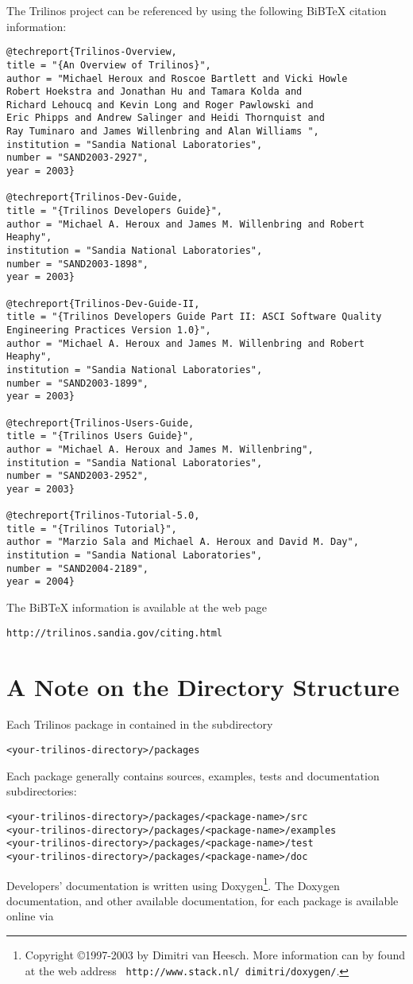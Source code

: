The Trilinos project can be referenced by using the following BiBTeX
citation information:
\begin{verbatim}
@techreport{Trilinos-Overview,
title = "{An Overview of Trilinos}",
author = "Michael Heroux and Roscoe Bartlett and Vicki Howle
Robert Hoekstra and Jonathan Hu and Tamara Kolda and
Richard Lehoucq and Kevin Long and Roger Pawlowski and
Eric Phipps and Andrew Salinger and Heidi Thornquist and
Ray Tuminaro and James Willenbring and Alan Williams ",
institution = "Sandia National Laboratories",
number = "SAND2003-2927",
year = 2003}

@techreport{Trilinos-Dev-Guide,
title = "{Trilinos Developers Guide}",
author = "Michael A. Heroux and James M. Willenbring and Robert Heaphy",
institution = "Sandia National Laboratories",
number = "SAND2003-1898",
year = 2003}

@techreport{Trilinos-Dev-Guide-II,
title = "{Trilinos Developers Guide Part II: ASCI Software Quality
Engineering Practices Version 1.0}",
author = "Michael A. Heroux and James M. Willenbring and Robert Heaphy",
institution = "Sandia National Laboratories",
number = "SAND2003-1899",
year = 2003}

@techreport{Trilinos-Users-Guide,
title = "{Trilinos Users Guide}",
author = "Michael A. Heroux and James M. Willenbring",
institution = "Sandia National Laboratories",
number = "SAND2003-2952",
year = 2003}

@techreport{Trilinos-Tutorial-5.0,
title = "{Trilinos Tutorial}",
author = "Marzio Sala and Michael A. Heroux and David M. Day",
institution = "Sandia National Laboratories",
number = "SAND2004-2189",
year = 2004}
\end{verbatim}
The BiBTeX information is available at the web page
\begin{verbatim}
http://trilinos.sandia.gov/citing.html
\end{verbatim}


\section{A Note on the Directory Structure}
\label{sec:into_note}

Each Trilinos package in contained in the subdirectory
\begin{verbatim}
<your-trilinos-directory>/packages
\end{verbatim}
Each package generally contains sources, examples, tests and documentation
subdirectories:
\begin{verbatim}
<your-trilinos-directory>/packages/<package-name>/src
<your-trilinos-directory>/packages/<package-name>/examples
<your-trilinos-directory>/packages/<package-name>/test
<your-trilinos-directory>/packages/<package-name>/doc
\end{verbatim}
Developers' documentation is written using Doxygen\footnote{Copyright
  \copyright 1997-2003 by Dimitri van Heesch. More information can by
  found at the web address {\tt
    http://www.stack.nl/~dimitri/doxygen/}.}.  The Doxygen documentation, and
other available documentation, for each package is available online via 


